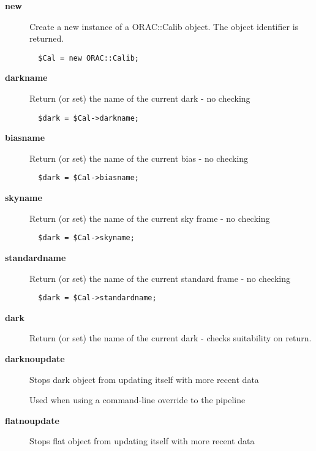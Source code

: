 \begin{description}
\item[\textbf{new}] \mbox{}

Create a new instance of a ORAC::Calib object.
The object identifier is returned.

\begin{verbatim}
  $Cal = new ORAC::Calib;
\end{verbatim}
\item[\textbf{darkname}] \mbox{}

Return (or set) the name of the current dark - no checking

\begin{verbatim}
  $dark = $Cal->darkname;
\end{verbatim}
\item[\textbf{biasname}] \mbox{}

Return (or set) the name of the current bias - no checking

\begin{verbatim}
  $dark = $Cal->biasname;
\end{verbatim}
\item[\textbf{skyname}] \mbox{}

Return (or set) the name of the current sky frame - no checking

\begin{verbatim}
  $dark = $Cal->skyname;
\end{verbatim}
\item[\textbf{standardname}] \mbox{}

Return (or set) the name of the current standard frame - no checking

\begin{verbatim}
  $dark = $Cal->standardname;
\end{verbatim}
\item[\textbf{dark}] \mbox{}

Return (or set) the name of the current dark - 
checks suitability on return.

\item[\textbf{darknoupdate}] \mbox{}

Stops dark object from updating itself with more recent data



Used when using a command-line override to the pipeline

\item[\textbf{flatnoupdate}] \mbox{}

Stops flat object from updating itself with more recent data




\end{description}
